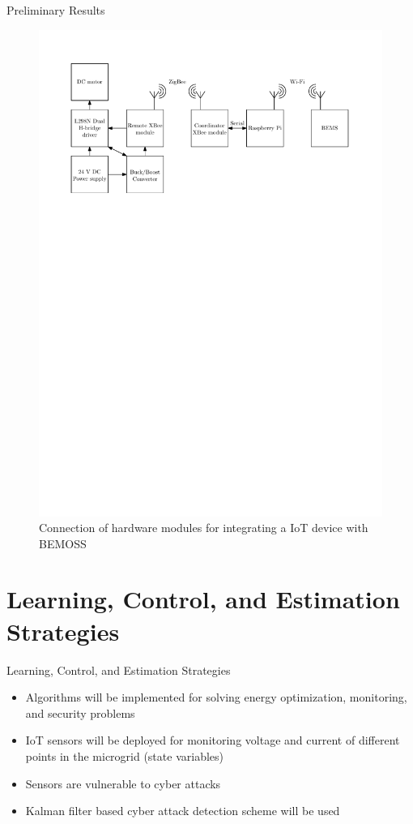\documentclass{beamer}
\begin{document}
\begin{frame}{Preliminary Results}
\begin{figure}
\includegraphics[scale=0.6]{../figs/ipe/motorSetup}
\caption{Connection of hardware modules for integrating a IoT device with BEMOSS}
\end{figure}
\end{frame}

\section{Learning, Control, and Estimation Strategies}
\begin{frame}{Learning, Control, and Estimation Strategies}
\begin{itemize}
\item Algorithms will be implemented for solving energy optimization, monitoring, and security problems
\item IoT sensors will be deployed for monitoring voltage and current of different points in the microgrid (state variables)
\item Sensors are vulnerable to cyber attacks 
\item Kalman filter based cyber attack detection scheme will be used
\end{itemize}
\end{frame}
\end{document}
